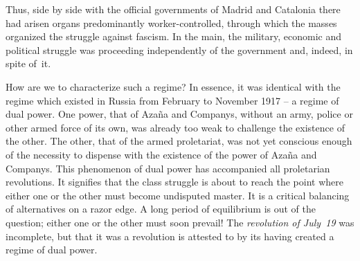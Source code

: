 Thus, side by side with the official governments of Madrid and Catalonia there had arisen organs predominantly worker-controlled, through which the masses organized the struggle against fascism. In the main, the military, economic and political struggle was proceeding independently of the government and, indeed, in spite of~it.

How are we to characterize such a regime? In essence, it was identical with the regime which existed in Russia from February to November 1917 -- a regime of dual power. One power, that of Azaña and Companys, without an army, police or other armed force of its own, was already too weak to challenge the existence of the other. The other, that of the armed proletariat, was not yet conscious enough of the necessity to dispense with the existence of the power of Azaña and Companys. This phenomenon of dual power has accompanied all proletarian revolutions. It signifies that the class struggle is about to reach the point where either one or the other must become undisputed master. It is a critical balancing of alternatives on a razor edge. A long period of equilibrium is out of the question; either one or the other must soon prevail! The \emph{revolution of July~19} was incomplete, but that it was a revolution is attested to by its having created a regime of dual power.